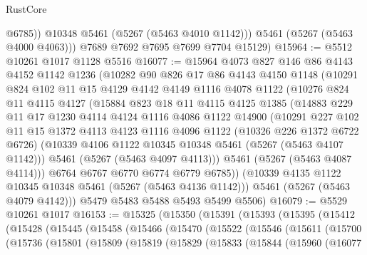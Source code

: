 \begin{lexlean}{RustCore}
\begin{coremodule}
              @6785))
          @10348
          @5461
          (@5267 (@5463 @4010 @1142)))
        @5461
        (@5267 (@5463 @4000 @4063)))
      @7689
      @7692
      @7695
      @7699
      @7704
      @15129)
@15964 := @5512 @10261 @1017 @1128 @5516
@16077 := @15964
    @4073
    @827
    @146
    @86
    @4143
    @4152
    @1142
    @1236
    (@10282
      @90
      @826
      @17
      @86
      @4143
      @4150
      @1148
      (@10291
        @824
        @102
        @11
        @15
        @4129
        @4142
        @4149
        @1116
        @4078
        @1122
        (@10276
          @824
          @11
          @4115
          @4127
          (@15884
            @823
            @18
            @11
            @4115
            @4125
            @1385
            (@14883
              @229
              @11
              @17
              @1230
              @4114
              @4124
              @1116
              @4086
              @1122
              @14900
              (@10291
                @227
                @102
                @11
                @15
                @1372
                @4113
                @4123
                @1116
                @4096
                @1122
                (@10326 @226 @1372 @6722 @6726)
                (@10339 @4106 @1122 @10345 @10348 @5461 (@5267 (@5463 @4107 @1142)))
                @5461
                (@5267 (@5463 @4097 @4113)))
              @5461
              (@5267 (@5463 @4087 @4114)))
            @6764
            @6767
            @6770
            @6774
            @6779
            @6785))
        (@10339 @4135 @1122 @10345 @10348 @5461 (@5267 (@5463 @4136 @1142)))
        @5461
        (@5267 (@5463 @4079 @4142)))
      @5479
      @5483
      @5488
      @5493
      @5499
      @5506)
@16079 := @5529 @10261 @1017
@16153 := @15325
    (@15350
      (@15391
        (@15393
          (@15395
            (@15412
              (@15428
                (@15445
                  (@15458
                    (@15466
                      (@15470
                        (@15522
                          (@15546
                            (@15611
                              (@15700
                                (@15736
                                  (@15801
                                    (@15809
                                      (@15819
                                        (@15829
                                          (@15833
                                            (@15844
                                              (@15960
                                                (@16077

\end{coremodule}
\end{lexlean}
